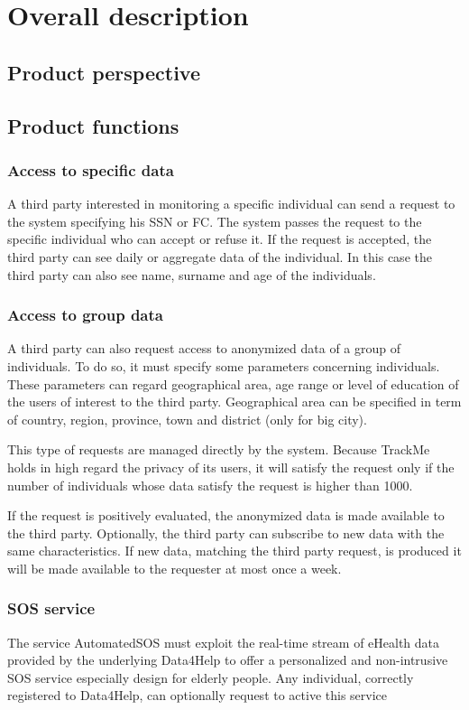 \chapter{Overall description}
\section{Product perspective}
\section{Product functions}


\subsection{Access to specific data}
A third party interested in monitoring a specific individual can send a request to the system specifying his SSN or FC.
The system passes the request to the specific individual who can accept or refuse it.
If the request is accepted, the third party can see daily or aggregate data of the individual. In this case the third party can also see name, surname and age of the individuals.


\subsection{Access to group data}
A third party can also request access to anonymized data of a group of individuals.
To do so, it must specify some parameters concerning individuals. These parameters can regard geographical area, age range or level of education of the users of interest to the third party.
Geographical area can be specified in term of country, region, province, town and district (only for big city).

This type of requests are managed directly by the system. Because TrackMe holds in high regard the privacy of its users, it will satisfy the request only if the number of individuals whose data satisfy the request is higher than 1000.

If the request is positively evaluated, the anonymized data is made available to the third party.
Optionally, the third party can subscribe to new data with the same characteristics. If new data, matching the third party request, is produced it will be made available to the requester at most once a week.




\subsection{SOS service}
The service AutomatedSOS must exploit the real-time stream of eHealth data provided by the underlying Data4Help to offer a personalized and non-intrusive SOS service especially design for elderly people.
Any individual, correctly registered to Data4Help, can optionally request to active this service


